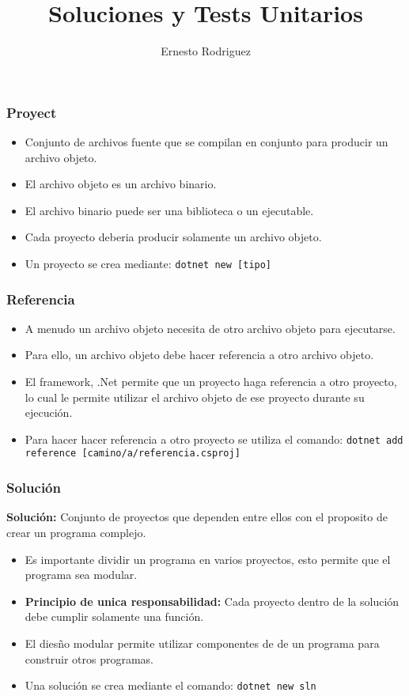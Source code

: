 \documentclass{beamer}
\title{Soluciones y Tests Unitarios}
\author{Ernesto Rodriguez}
\institute{
    Universidad del Itsmo \\
    \medskip \textit{erodriguez@unis.edu.gt}
}
\date[\today]{}
\begin{document}
\begin{frame}
\titlepage
\end{frame}

\begin{frame}
    \frametitle{Proyect}
    \begin{itemize}
        \item{Conjunto de archivos fuente que se compilan en conjunto para producir un archivo objeto.}
        \item{El archivo objeto es un archivo binario.}
        \item{El archivo binario puede ser una biblioteca o un ejecutable.}
        \item{Cada proyecto deberia producir solamente un archivo objeto.}
        \item{Un proyecto se crea mediante: \texttt{dotnet new [tipo]}}
    \end{itemize}
\end{frame}

\begin{frame}
    \frametitle{Referencia}
    \begin{itemize}
        \item{A menudo un archivo objeto necesita de otro archivo objeto para ejecutarse.}
        \item{Para ello, un archivo objeto debe hacer referencia a otro archivo objeto.}
        \item{El framework, .Net permite que un proyecto haga referencia a otro proyecto,
            lo cual le permite utilizar el archivo objeto de ese proyecto durante
            su ejecuci\'on.}
        \item{Para hacer hacer referencia a otro proyecto se utiliza el comando:
            \texttt{dotnet add reference [camino/a/referencia.csproj]}}
    \end{itemize}
\end{frame}

\begin{frame}
    \frametitle{Soluci\'on}
    {\bf Soluci\'on:} Conjunto de proyectos que dependen entre ellos
    con el proposito de crear un programa complejo.
    \begin{itemize}
        \item{Es importante dividir un programa en varios proyectos,
        esto permite que el programa sea modular.}
        \item{{\bf Principio de unica responsabilidad:} Cada proyecto dentro de la soluci\'on debe cumplir
        solamente una funci\'on.}
        \item{El dies\~no modular permite utilizar componentes de de un
        programa para construir otros programas.}
        \item{Una soluci\'on se crea mediante el comando: \texttt{dotnet new sln}}
    \end{itemize}
\end{frame}
\end{document}
